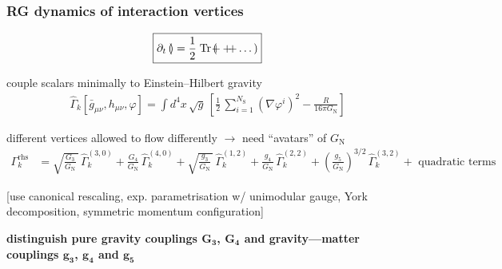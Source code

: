 \documentclass[]{beamer}  %
\newcommand\NS{ N_{\scriptscriptstyle{\mathrm{S}}} }
\newcommand\GNewton{ G_{\scriptscriptstyle{\mathrm{N}}}{} }
\begin{document}
\begin{frame}
  \frametitle{RG dynamics of interaction vertices}

  \begin{align*}
    \boxed{
      \partial_t
      \left(
        \hspace{-5pt}
        
        \hspace{2pt}
      \right)
      =
      \frac12 \;
      \mathrm{Tr}
      \left(
        \hspace{-5pt}
        
        + 
        +
        
        \hspace{-5pt}
        + \dots
      \right)
    }
  \end{align*}

  couple scalars minimally to Einstein--Hilbert gravity
  \begin{align*}
    \hat \Gamma_k[\bar g_{\mu\nu}, h_{\mu\nu}, \varphi] = \int d^4x \, \sqrt{g} \,
    \left[
      \frac{1}{2} \, \sum_{i=1}^{\NS} \left( \nabla\varphi^i \right)^2
      - \frac{R}{16 \pi \GNewton}
    \right]
  \end{align*}

  different vertices allowed to flow differently $\rightarrow$ need ``avatars'' of $\GNewton$
  \begin{align*}
    \Gamma_k^\mathrm{rhs} &=
    \sqrt{ \frac{G_3}{\GNewton} \, } \, \hat\Gamma^{(3,0)}_k
    + \frac{G_4}{\GNewton} \, \hat\Gamma^{(4,0)}_k
    + \sqrt{ \frac{g_3}{\GNewton} \, } \, \hat\Gamma^{(1,2)}_k
    + \frac{g_4}{ \GNewton} \, \hat\Gamma^{(2,2)}_k
    + \left(\frac{g_5}{ \GNewton}\right)^{3/2} \, \hat\Gamma^{(3,2)}_k
    + \mbox{ quadratic terms }
  \end{align*}

  \vspace{-5pt}
  \fontsize{6pt}{7.2}\selectfont
  \hfill [use canonical rescaling, exp. parametrisation w/ unimodular gauge,
  York decomposition, symmetric momentum configuration]

  \vspace{15pt}
  \fontsize{8pt}{7.2}\selectfont
  \begin{center}
    \textbf{
      distinguish pure gravity couplings $\mathbf{G_3}$, $\mathbf{G_4}$ and gravity---matter couplings
      $\mathbf{g_3}$, $\mathbf{g_4}$ and $\mathbf{g_5}$
    }
  \end{center}
\end{frame}
\end{document}
